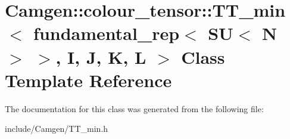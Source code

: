 \hypertarget{a00552}{}\section{Camgen\+:\+:colour\+\_\+tensor\+:\+:T\+T\+\_\+min$<$ fundamental\+\_\+rep$<$ S\+U$<$ N $>$ $>$, I, J, K, L $>$ Class Template Reference}
\label{a00552}


The documentation for this class was generated from the following file\+:\begin{DoxyCompactItemize}
\item 
include/\+Camgen/T\+T\+\_\+min.\+h\end{DoxyCompactItemize}
